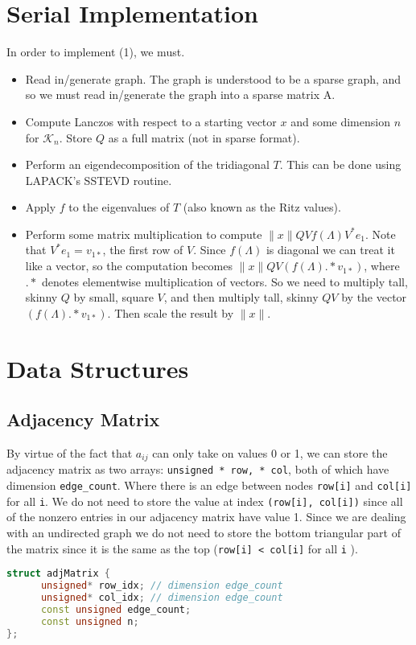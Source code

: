 \documentclass[a4paper, fleqn]{article}
\begin{document}
\section{Serial Implementation}%
\label{sec:serial_implementation}
In order to implement (1), we must.

\begin{itemize}
        \item Read in/generate graph. The graph is understood to be a sparse graph, and so we must read in/generate the graph into a sparse matrix A.
        \item Compute Lanczos with respect to a starting vector $x$ and some dimension $n$ for  $\mathcal{K}_n$. Store $Q$ as a full matrix (not in sparse format).
        \item Perform an eigendecomposition of the tridiagonal $T$. This can be done using LAPACK's SSTEVD routine.
        \item Apply $f$ to the eigenvalues of $T$ (also known as the Ritz values).
        \item Perform some matrix multiplication to compute $\|x\|QVf(\Lambda)V^*e_1$. Note that $V^*e_1 = v_{1*}$, the first row of  $V$. Since $f(\Lambda)$ is diagonal we can treat it like a vector, so the computation becomes $\|x\|QV\left(f(\Lambda).*v_{1*}\right)$, where $.*$ denotes elementwise multiplication of vectors. So we need to multiply tall, skinny $Q$ by small, square $V$, and then multiply tall, skinny  $QV$ by the vector $\left(f(\Lambda).*v_{1*}\right)$. Then scale the result by $\|x\|$.
\end{itemize}

\section{Data Structures}%
\label{sec:data_structures}
\subsection{Adjacency Matrix}%
\label{sub:adjacency_matrix}


By virtue of the fact that $a_{ij}$ can only take on values 0 or 1, we can store the adjacency matrix as two arrays: \texttt{unsigned * row, * col}, both of which have dimension \texttt{edge\_count}. Where there is an edge between nodes \texttt{row[i]} and \texttt{col[i]} for all \texttt{i}. We do not need to store the value at index \texttt{(row[i], col[i])} since all of the nonzero entries in our adjacency matrix have value 1. Since we are dealing with an undirected graph we do not need to store the bottom triangular part of the matrix since it is the same as the top (\texttt{row[i] < col[i]} for all  \texttt{i}  ).
\begin{lstlisting}[language = C++]
struct adjMatrix {
      unsigned* row_idx; // dimension edge_count
      unsigned* col_idx; // dimension edge_count
      const unsigned edge_count;
      const unsigned n;
};
\end{lstlisting}
\end{document}

